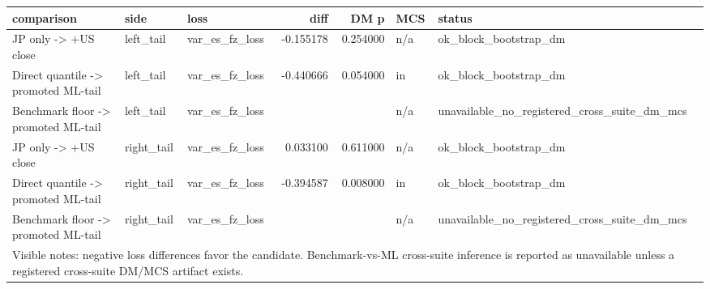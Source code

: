 \begin{tabular}{lllrrll}
\toprule
comparison & side & loss & diff & DM p & MCS & status \\
\midrule
JP only -> +US close & left\_tail & var\_es\_fz\_loss & -0.155178 & 0.254000 & n/a & ok\_block\_bootstrap\_dm \\
Direct quantile -> promoted ML-tail & left\_tail & var\_es\_fz\_loss & -0.440666 & 0.054000 & in & ok\_block\_bootstrap\_dm \\
Benchmark floor -> promoted ML-tail & left\_tail & var\_es\_fz\_loss &  &  & n/a & unavailable\_no\_registered\_cross\_suite\_dm\_mcs \\
JP only -> +US close & right\_tail & var\_es\_fz\_loss & 0.033100 & 0.611000 & n/a & ok\_block\_bootstrap\_dm \\
Direct quantile -> promoted ML-tail & right\_tail & var\_es\_fz\_loss & -0.394587 & 0.008000 & in & ok\_block\_bootstrap\_dm \\
Benchmark floor -> promoted ML-tail & right\_tail & var\_es\_fz\_loss &  &  & n/a & unavailable\_no\_registered\_cross\_suite\_dm\_mcs \\
\midrule
\multicolumn{7}{l}{\footnotesize Visible notes: negative loss differences favor the candidate. Benchmark-vs-ML cross-suite inference is reported as unavailable unless a registered cross-suite DM/MCS artifact exists.} \\
\bottomrule
\end{tabular}
